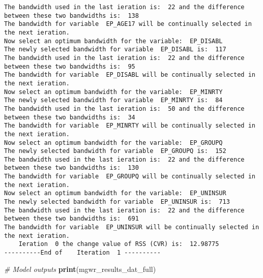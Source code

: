 \documentclass[
  12pt,
]{article}
\newenvironment{Shaded}{\begin{snugshade}}{\end{snugshade}}
\newcommand{\CommentTok}[1]{\textcolor[rgb]{0.56,0.35,0.01}{\textit{#1}}}
\newcommand{\FunctionTok}[1]{\textcolor[rgb]{0.13,0.29,0.53}{\textbf{#1}}}
\newcommand{\NormalTok}[1]{#1}
\begin{document}
\begin{verbatim}
The bandwidth used in the last ieration is:  22 and the difference between these two bandwidths is:  138 
The bandwidth for variable  EP_AGE17 will be continually selected in the next ieration.
Now select an optimum bandwidth for the variable:  EP_DISABL 
The newly selected bandwidth for variable  EP_DISABL is:  117 
The bandwidth used in the last ieration is:  22 and the difference between these two bandwidths is:  95 
The bandwidth for variable  EP_DISABL will be continually selected in the next ieration.
Now select an optimum bandwidth for the variable:  EP_MINRTY 
The newly selected bandwidth for variable  EP_MINRTY is:  84 
The bandwidth used in the last ieration is:  50 and the difference between these two bandwidths is:  34 
The bandwidth for variable  EP_MINRTY will be continually selected in the next ieration.
Now select an optimum bandwidth for the variable:  EP_GROUPQ 
The newly selected bandwidth for variable  EP_GROUPQ is:  152 
The bandwidth used in the last ieration is:  22 and the difference between these two bandwidths is:  130 
The bandwidth for variable  EP_GROUPQ will be continually selected in the next ieration.
Now select an optimum bandwidth for the variable:  EP_UNINSUR 
The newly selected bandwidth for variable  EP_UNINSUR is:  713 
The bandwidth used in the last ieration is:  22 and the difference between these two bandwidths is:  691 
The bandwidth for variable  EP_UNINSUR will be continually selected in the next ieration.
    Ieration  0 the change value of RSS (CVR) is:  12.98775 
----------End of    Iteration  1 ----------
\end{verbatim}

\begin{Shaded}
\begin{Highlighting}[]
\CommentTok{\# Model outputs}
\FunctionTok{print}\NormalTok{(mgwr\_results\_dat\_full)}
\end{Highlighting}
\end{Shaded}
\end{document}
